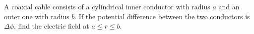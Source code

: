 A coaxial cable consists of a cylindrical inner conductor with
radius $a$ and an outer one with radius $b$. If the potential
difference between the two conductors is $\Delta\phi$, find
the electric field at $a\le r\le b$.\answercheck
